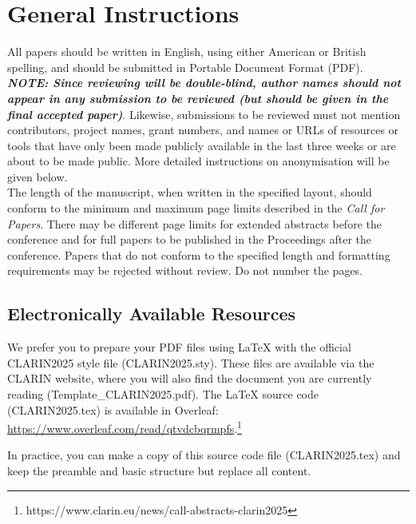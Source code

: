 \documentclass[a4paper,11pt]{article}
\begin{document}

\section{General Instructions}

All papers should be written in English, using either American or British spelling, and should be submitted in Portable Document Format (PDF).\\

\textbf{\emph{NOTE: Since reviewing will be double-blind, author names should not appear in any submission to be reviewed (but should be given in the final accepted paper)}}.
Likewise, submissions to be reviewed must not mention contributors, project names, grant numbers, and names or URLs of resources or tools that have only been made publicly available in
the last three weeks or are about to be made public.
More detailed instructions on anonymisation will be given below.\\

The length of the manuscript, when written in the specified layout,
should conform to the minimum and maximum page limits described in the \emph{Call for Papers}.
There may be different page limits for extended abstracts before the conference and for full papers to be published in the Proceedings after the conference.
Papers that do not conform to the specified length and formatting requirements may be rejected without review.
Do not number the pages.


\subsection{Electronically Available Resources}

We prefer you to prepare your PDF files using LaTeX with the official CLARIN2025 style file (CLARIN2025.sty). These files are available via the CLARIN website, where you will also find the document you are currently reading (Template\_CLARIN2025.pdf). The LaTeX source code (CLARIN2025.tex) is available in Overleaf: \url{https://www.overleaf.com/read/qtvdcbqrmpfs}.\footnote{{https://www.clarin.eu/news/call-abstracts-clarin2025}}  

In practice, you can make a copy of this source code file (CLARIN2025.tex) and keep the preamble and basic structure but replace all content.\\
\end{document}
